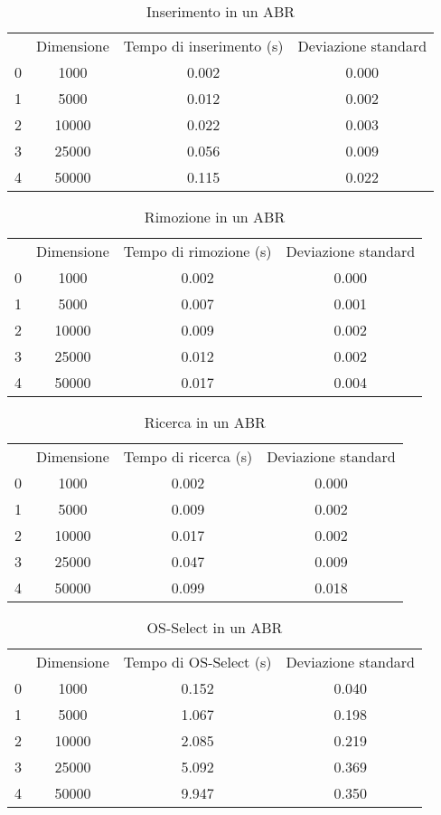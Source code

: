 \begin{table}[H]
\centering
\caption{Inserimento in un ABR}
\label{Inserimento in un ABR}
\begin{tabular}{cccc}
 & Dimensione & Tempo di inserimento (s) & Deviazione standard \\
0 & 1000 & 0.002 & 0.000 \\
\cline{1-4}
1 & 5000 & 0.012 & 0.002 \\
\cline{1-4}
2 & 10000 & 0.022 & 0.003 \\
\cline{1-4}
3 & 25000 & 0.056 & 0.009 \\
\cline{1-4}
4 & 50000 & 0.115 & 0.022 \\
\cline{1-4}
\end{tabular}
\end{table}

\begin{table}[H]
\centering
\caption{Rimozione in un ABR}
\label{Rimozione in un ABR}
\begin{tabular}{cccc}
 & Dimensione & Tempo di rimozione (s) & Deviazione standard \\
0 & 1000 & 0.002 & 0.000 \\
\cline{1-4}
1 & 5000 & 0.007 & 0.001 \\
\cline{1-4}
2 & 10000 & 0.009 & 0.002 \\
\cline{1-4}
3 & 25000 & 0.012 & 0.002 \\
\cline{1-4}
4 & 50000 & 0.017 & 0.004 \\
\cline{1-4}
\end{tabular}
\end{table}

\begin{table}[H]
\centering
\caption{Ricerca in un ABR}
\label{Ricerca in un ABR}
\begin{tabular}{cccc}
 & Dimensione & Tempo di ricerca (s) & Deviazione standard \\
0 & 1000 & 0.002 & 0.000 \\
\cline{1-4}
1 & 5000 & 0.009 & 0.002 \\
\cline{1-4}
2 & 10000 & 0.017 & 0.002 \\
\cline{1-4}
3 & 25000 & 0.047 & 0.009 \\
\cline{1-4}
4 & 50000 & 0.099 & 0.018 \\
\cline{1-4}
\end{tabular}
\end{table}

\begin{table}[H]
\centering
\caption{OS-Select in un ABR}
\label{OS-Select in un ABR}
\begin{tabular}{cccc}
 & Dimensione & Tempo di OS-Select (s) & Deviazione standard \\
0 & 1000 & 0.152 & 0.040 \\
\cline{1-4}
1 & 5000 & 1.067 & 0.198 \\
\cline{1-4}
2 & 10000 & 2.085 & 0.219 \\
\cline{1-4}
3 & 25000 & 5.092 & 0.369 \\
\cline{1-4}
4 & 50000 & 9.947 & 0.350 \\
\cline{1-4}
\end{tabular}
\end{table}

